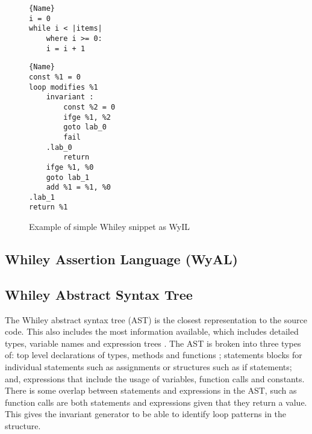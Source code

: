 \begin{figure}
\noindent\begin{minipage}{.45\textwidth}
\begin{lstlisting}[caption={Whiley Code},frame=tlrb,numbers=none]{Name}
i = 0
while i < |items|
    where i >= 0:
    i = i + 1
\end{lstlisting}
\end{minipage}\hfill
\begin{minipage}{.45\textwidth}
\begin{lstlisting}[caption={WyIL Code},frame=tlrb,numbers=none]{Name}
const %1 = 0
loop modifies %1
    invariant :
        const %2 = 0
        ifge %1, %2
        goto lab_0
        fail
    .lab_0
        return
    ifge %1, %0
    goto lab_1
    add %1 = %1, %0
.lab_1
return %1
\end{lstlisting}
\end{minipage}
    \label{lst:design-wyil}
    \caption{Example of simple Whiley snippet as WyIL}
\end{figure}

\subsection{Whiley Assertion Language (WyAL)}


\subsection{Whiley Abstract Syntax Tree}

The Whiley abstract syntax tree (AST) is the closest representation to
the source code.
This also includes the most information available, which includes detailed
types, variable names and expression trees \cite{whiley-origin}.
The AST is broken into three types of: top level declarations of types,
methods and functions ; statements blocks for individual statements
such as assignments or structures such as if statements; and, expressions
that include the usage of variables, function calls and constants.
There is some overlap between statements and expressions in the AST,
such as function calls are both statements and expressions given that they
return a value.
This gives the invariant generator to be able to identify loop patterns in the
structure.

